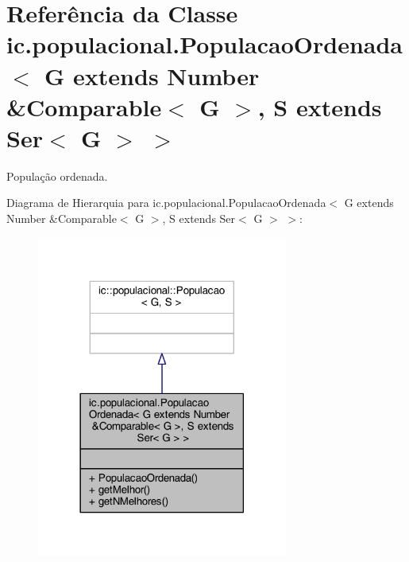 \hypertarget{classic_1_1populacional_1_1_populacao_ordenada_3_01_g_01extends_01_number_01_6_comparable_3_01_gcbbf91bc78c3435d640426d27f204196}{\section{Referência da Classe ic.\-populacional.\-Populacao\-Ordenada$<$ G extends Number \&Comparable$<$ G $>$, S extends Ser$<$ G $>$ $>$}
\label{classic_1_1populacional_1_1_populacao_ordenada_3_01_g_01extends_01_number_01_6_comparable_3_01_gcbbf91bc78c3435d640426d27f204196}
}


População ordenada.  




Diagrama de Hierarquia para ic.\-populacional.\-Populacao\-Ordenada$<$ G extends Number \&Comparable$<$ G $>$, S extends Ser$<$ G $>$ $>$\-:
\nopagebreak
\begin{figure}[H]
\begin{center}
\leavevmode
\includegraphics[width=234pt]{classic_1_1populacional_1_1_populacao_ordenada_3_01_g_01extends_01_number_01_6_comparable_3_01_g6847f4c43a52b51b0753a311aa2d5352}
\end{center}
\end{figure}


